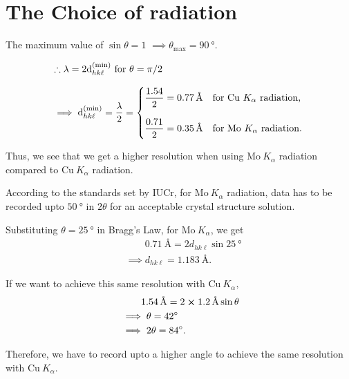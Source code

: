 \section{The Choice of radiation}
	
The maximum value of $\sin \theta = 1$ $\implies \theta_\mathrm{max} = \SI{90}{\degree}.$

\begin{align}
&\therefore \lambda = 2 \d_{hk\ell}^\mathrm{(min)} ~ \mathrm{for} ~ \theta = \pi/2 \nonumber \\[0.8em]
&\implies \d_{hk\ell}^\mathrm{(min)} = \dfrac{\lambda}{2} = \begin{dcases*}
\dfrac{1.54}{2} = \SI{0.77}{\angstrom} & for $\mathrm{Cu}~K_\alpha$ radiation, \\[0.8em]
\dfrac{0.71}{2} = \SI{0.35}{\angstrom} & for $\mathrm{Mo}~K_\alpha$ radiation.
\end{dcases*}
\end{align}

Thus, we see that we get a higher resolution when using $\mathrm{Mo}~K_\alpha$ radiation compared to $\mathrm{Cu}~K_\alpha$ radiation.

According to the standards set by IUCr, for $\mathrm{Mo}~K_\alpha$ radiation, data has to be recorded  upto $\SI{50}{\degree}$ in $2\theta$ for an acceptable crystal structure solution.

Substituting $\theta = \SI{25}{\degree}$ in Bragg's Law, for $\mathrm{Mo}~K_\alpha$, we get%
%
\begin{align}
&\phantom{\implies} \SI{0.71}{\angstrom} = 2 d_{hk\ell} \sin \SI{25}{\degree} \nonumber \\
&\implies d_{hk\ell} = \SI{1.183}{\angstrom}.
\end{align}

If we want to achieve this same resolution with $\mathrm{Cu}~K_\alpha,$%
%
\begin{align}
&\phantom{\implies} \SI{1.54}{\angstrom} = 2 \cross \SI{1.2}{\angstrom} \sin \theta \nonumber \\
&\implies \theta = \SI{42}{\degree} \nonumber \\
&\implies 2\theta = \SI{84}{\degree}.
\end{align}

Therefore, we have to record upto a higher angle to achieve the same resolution with $\mathrm{Cu}~K_\alpha.$

